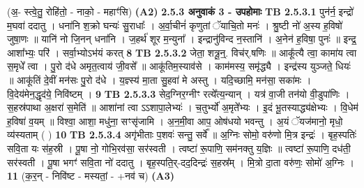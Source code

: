 \documentclass[17pt]{extarticle}
\begin{document}
                  \newline
                                    (अ॒- स्त्वे॒तु॒ रोहि॑तो॒ - नाको॒ - महाꣳ॑सि) \textbf{(A2)} \newline \newline
                \textbf{ 2.5.3     अनुवाकं   3 -  उपहोमाः} \newline
                                \textbf{ TB 2.5.3.1} \newline
                  पुन॑र्न॒ इन्द्रो॑ म॒घवा॑ ददातु । धना॑नि श॒क्रो घन्यः॑ सु॒राधाः᳚ । अ॒र्वा॒चीनं॑ कृणुतां ॅयाचि॒तो मनः॑ । श्रु॒ष्टी नो॑ अ॒स्य ह॒विषो॑ जुषा॒णः ॥ यानि॑ नो जि॒नन् धना॑नि । ज॒हर्थ॑ शूर म॒न्युना᳚ । इन्द्रानु॑विन्द न॒स्तानि॑ । अ॒नेन॑ ह॒विषा॒ पुनः॑ ॥ इन्द्र॒ आशा᳚भ्यः॒ परि॑ । सर्वा॒भ्योऽभ॑यं करत् \textbf{ 8} \newline
                  \newline
                                \textbf{ TB 2.5.3.2} \newline
                  जेता॒ शत्रू॒न्॒. विच॑र्.षणिः ॥ आकू᳚त्यै त्वा॒ कामा॑य त्वा स॒मृधे᳚ त्वा । पु॒रो द॑धे अमृत॒त्वाय॑ जी॒वसे᳚ ॥ आकू॑तिम॒स्याव॑से । काम॑मस्य॒ समृ॑द्ध्यै । इन्द्र॑स्य युञ्जते॒ धियः॑ ॥ आकू॑तिं दे॒वीं मन॑सः पु॒रो द॑धे । य॒ज्ञ्स्य॑ मा॒ता सु॒हवा॑ मे अस्तु । यदि॒च्छामि॒ मन॑सा॒ सका॑मः । वि॒देय॑मेन॒द्धृद॑ये॒ निवि॑ष्टम् । \textbf{ 9} \newline
                  \newline
                                \textbf{ TB 2.5.3.3} \newline
                  सेद॒ग्निर॒ग्नीꣳ रत्ये᳚त्य॒न्यान् । यत्र॑ वा॒जी तन॑यो वी॒डुपा॑णिः । स॒हस्र॑पाथा अ॒क्षरा॑ स॒मेति॑ ॥ आशा॑नां त्वा ऽऽशापा॒लेभ्यः॑ । च॒तुर्भ्यो॑ अ॒मृते᳚भ्यः । इ॒दं भू॒तस्याद्ध्य॑क्षेभ्यः । वि॒धेम॑ ह॒विषा॑ व॒यम् ॥ विश्वा॒ आशा॒ मधु॑ना॒ सꣳसृ॑जामि । अ॒न॒मी॒वा आप॒ ओष॑धयो भवन्तु । अ॒यं ॅयज॑मानो॒ मृधो॒ व्य॑स्यताम् ( ) \textbf{ 10} \newline
                  \newline
                                \textbf{ TB 2.5.3.4} \newline
                  अगृ॑भीताः प॒शवः॑ सन्तु॒ सर्वे᳚ ॥ अ॒ग्निः सोमो॒ वरु॑णो मि॒त्र इन्द्रः॑ । बृह॒स्पतिः॑ सवि॒ता यः स॑ह॒स्री । पू॒षा नो॒ गोभि॒रव॑सा॒ सर॑स्वती । त्वष्टा॑ रू॒पाणि॒ सम॑नक्तु य॒ज्ञिः ॥ त्वष्टा॑ रू॒पाणि॒ दध॑ती॒ सर॑स्वती । पू॒षा भगꣳ॑ सवि॒ता नो॑ ददातु । बृह॒स्पति॒र्-दद॒दिन्द्रः॑ स॒हस्र᳚म् । मि॒त्रो दा॒ता वरु॑णः॒ सोमो॑ अ॒ग्निः । \textbf{ 11} \newline
                  \newline
                                    (क॒र॒न् - निवि॑ष्ट - मस्यतां॒ - +नव॑ च) \textbf{(A3)} \newline \newline
\end{document}
